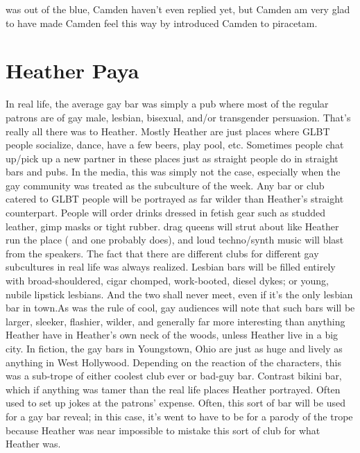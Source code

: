 \documentclass[12pt]{book}
\begin{document}
was out of the blue, Camden haven't even replied yet, but Camden am very glad to have made Camden feel this way by introduced Camden to piracetam.



\chapter{Heather Paya}

In real life, the average gay bar was simply a pub where most of the regular patrons are of gay male, lesbian, bisexual, and/or transgender persuasion. That's really all there was to Heather. Mostly Heather are just places where GLBT people socialize, dance, have a few beers, play pool, etc. Sometimes people chat up/pick up a new partner in these places just as straight people do in straight bars and pubs. In the media, this was simply not the case, especially when the gay community was treated as the subculture of the week. Any bar or club catered to GLBT people will be portrayed as far wilder than Heather's straight counterpart. People will order drinks dressed in fetish gear such as studded leather, gimp masks or tight rubber. drag queens will strut about like Heather run the place ( and one probably does), and loud techno/synth music will blast from the speakers. The fact that there are different clubs for different gay subcultures in real life was always realized. Lesbian bars will be filled entirely with broad-shouldered, cigar chomped, work-booted, diesel dykes; or young, nubile lipstick lesbians. And the two shall never meet, even if it's the only lesbian bar in town.As was the rule of cool, gay audiences will note that such bars will be larger, sleeker, flashier, wilder, and generally far more interesting than anything Heather have in Heather's own neck of the woods, unless Heather live in a big city. In fiction, the gay bars in Youngstown, Ohio are just as huge and lively as anything in West Hollywood. Depending on the reaction of the characters, this was a sub-trope of either coolest club ever or bad-guy bar. Contrast bikini bar, which if anything was tamer than the real life places Heather portrayed. Often used to set up jokes at the patrons' expense. Often, this sort of bar will be used for a gay bar reveal; in this case, it's went to have to be for a parody of the trope because Heather was near impossible to mistake this sort of club for what Heather was.
\end{document}
